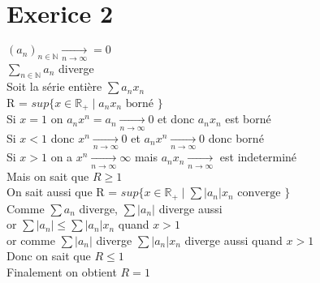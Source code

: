 \documentclass{article}
\author{Frederic Becerril}
\newcommand{\mylim}[2]{\underset{#1 \rightarrow #2}{\longrightarrow}}
\begin{document}
\part*{Exerice 2}

$(a_n)_{n \in \mathbb{N}} \mylim{n}{\infty} = 0$\\
$\sum_{n \in \mathbb{N}} a_n$ diverge\\
Soit la série entière $\sum a_n x_n$\\
R = $sup \{x\in \mathbb{R}_+ \;|\; a_n x_n \mbox{ borné }\}$\\
Si $x = 1$ on $a_n x^n = a_n \mylim{n}{\infty} 0$ et donc $a_n x_n$ est borné\\
Si $x < 1$ donc $x^n \mylim{n}{\infty} 0$ et $a_n x^n \mylim{n}{\infty} 0$ donc borné\\
Si $x > 1$ on a $x^n \mylim{n}{\infty} \infty$ mais $a_n x_n \mylim{n}{\infty}$ est indeterminé\\
Mais on sait que $R \geq 1$\\
On sait aussi que R = $sup \{x\in \mathbb{R}_+ \;|\; \sum |a_n| x_n \mbox{ converge }\}$\\
Comme $\sum a_n$ diverge, $\sum |a_n|$ diverge aussi\\
or $\sum |a_n| \leq \sum |a_n| x_n$ quand $x > 1$\\
or comme $\sum |a_n|$ diverge $\sum |a_n| x_n$ diverge aussi quand $x > 1$\\
Donc on sait que $R \leq 1$\\
Finalement on obtient $R = 1$
\end{document}
